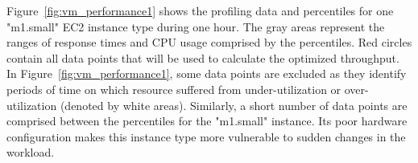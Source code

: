 
Figure~\ref{fig:vm_performance1} shows the profiling data and percentiles for one "m1.small" EC2 instance type during one hour. The gray areas represent the ranges of response times and CPU usage comprised by the percentiles. Red circles contain all data points that will be used to calculate the optimized throughput. In Figure~\ref{fig:vm_performance1}, some data points are excluded as they identify periods of time on which resource suffered from under-utilization or over-utilization (denoted by white areas). Similarly, a short number of data points are comprised between the percentiles for the "m1.small" instance. Its poor hardware configuration makes this instance type more vulnerable to sudden changes in the workload.




